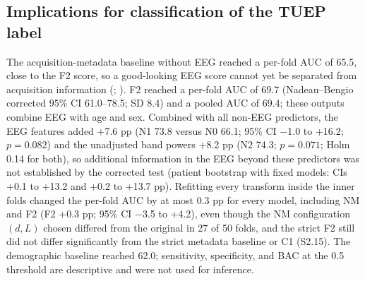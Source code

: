 

\subsection{Implications for classification of the TUEP label}\label{sec:kinerja}

The acquisition-metadata baseline without EEG reached a per-fold AUC of 65.5, close to the F2 score, so a good-looking EEG score cannot yet be separated from acquisition information (; ).
F2 reached a per-fold AUC of 69.7 (Nadeau--Bengio corrected 95\% CI 61.0--78.5; SD 8.4) and a pooled AUC of 69.4; these outputs combine EEG with age and sex.
Combined with all non-EEG predictors, the EEG features added +7.6 pp (N1 73.8 versus N0 66.1; 95\% CI $-$1.0 to +16.2; $p = 0.082$) and the unadjusted band powers +8.2 pp (N2 74.3; $p = 0.071$; Holm 0.14 for both), so additional information in the EEG beyond these predictors was not established by the corrected test (patient bootstrap with fixed models: CIs +0.1 to +13.2 and +0.2 to +13.7 pp).
Refitting every transform inside the inner folds changed the per-fold AUC by at most 0.3 pp for every model, including NM and F2 (F2 +0.3 pp; 95\% CI $-$3.5 to +4.2), even though the NM configuration $(d, L)$ chosen differed from the original in 27 of 50 folds, and the strict F2 still did not differ significantly from the strict metadata baseline or C1 (S2.15).
The demographic baseline reached 62.0; sensitivity, specificity, and BAC at the 0.5 threshold are descriptive and were not used for inference.

